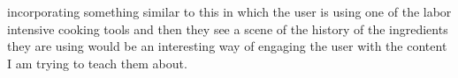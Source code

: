 \documentclass[10pt,twocolumn]{article}
\begin{document}
incorporating something similar to this in which the user is using one of the labor intensive cooking tools and then they see a scene of the history of the ingredients they are using would be an interesting way of engaging the user with the content I am trying to teach them about. 

\printbibliography 
\end{document}

